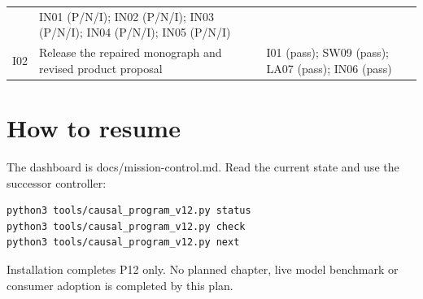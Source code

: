\documentclass[
  11pt,
  a4paper,
]{article}
\begin{document}
\begin{longtable}[]{@{}lll@{}}
\begin{minipage}[t]{0.30\columnwidth}
\end{minipage} & \begin{minipage}[t]{0.30\columnwidth}\raggedright
IN01 (P/N/I); IN02 (P/N/I); IN03 (P/N/I); IN04 (P/N/I); IN05
(P/N/I)\strut
\end{minipage}\tabularnewline
\begin{minipage}[t]{0.30\columnwidth}\raggedright
I02\strut
\end{minipage} & \begin{minipage}[t]{0.30\columnwidth}\raggedright
Release the repaired monograph and revised product proposal\strut
\end{minipage} & \begin{minipage}[t]{0.30\columnwidth}\raggedright
I01 (pass); SW09 (pass); LA07 (pass); IN06 (pass)\strut
\end{minipage}\tabularnewline
\bottomrule
\end{longtable}

\hypertarget{how-to-resume}{%
\section{How to resume}\label{how-to-resume}}

The dashboard is docs/mission-control.md. Read the current state and use
the successor controller:

\begin{verbatim}
python3 tools/causal_program_v12.py status
python3 tools/causal_program_v12.py check
python3 tools/causal_program_v12.py next
\end{verbatim}

Installation completes P12 only. No planned chapter, live model
benchmark or consumer adoption is completed by this plan.
\end{document}

